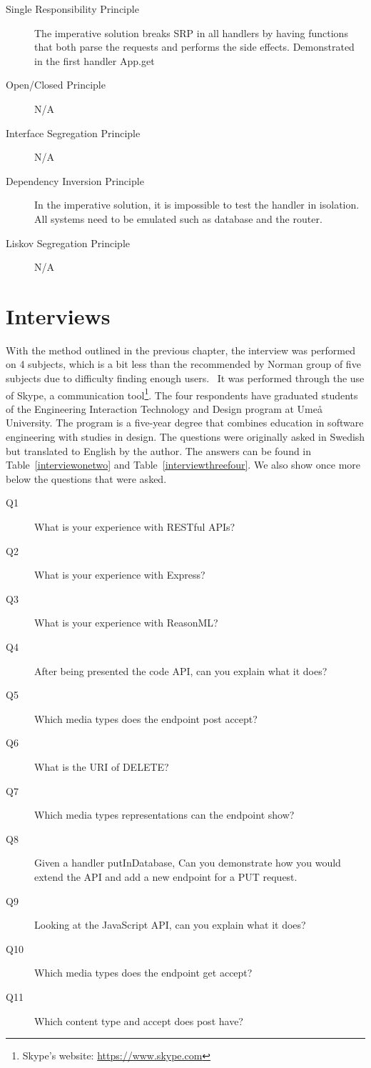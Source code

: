 \begin{description}
	\item[Single Responsibility Principle] The imperative solution breaks SRP
in all handlers by having functions that both parse the requests and performs
the side effects. Demonstrated in the first handler App.get
	\item[Open/Closed Principle] N/A
	\item[Interface Segregation Principle] N/A
	\item[Dependency Inversion Principle] In the imperative solution, it is 
impossible to test the handler in isolation. All systems need to be emulated
such as database and the router.
	\item[Liskov Segregation Principle] N/A
\end{description}

\section{Interviews}\label{interviews}

With the method outlined in the previous chapter, the interview was performed on
4 subjects, which is a bit less than the recommended by Norman group of five
subjects due to difficulty finding enough users.~\cite{jakobnielsen}
It was performed through the use of Skype, a communication tool\footnote{Skype's
website: \url{https://www.skype.com}}. The four respondents have graduated
students of the Engineering Interaction Technology and Design program at Umeå
University. The program is a five-year degree that combines education in
software engineering with studies in design. The questions were originally asked
in Swedish but translated to English by the author. The answers can be found in
Table~\ref{interviewonetwo} and Table~\ref{interviewthreefour}. We also show
once more below the questions that were asked.

\begin{description}
    \item[Q1] What is your experience with RESTful APIs?
    \item[Q2] What is your experience with Express?
    \item[Q3] What is your experience with ReasonML?
    \item[Q4] After being presented the code API, can you explain what it does?
    \item[Q5] Which media types does the endpoint post accept?
    \item[Q6] What is the URI of DELETE?
    \item[Q7] Which media types representations can the endpoint show?
    \item[Q8] Given a handler putInDatabase, Can you demonstrate how you would
        extend the API and add a new endpoint for a PUT request.
    \item[Q9] Looking at the JavaScript API, can you explain what it does?
    \item[Q10] Which media types does the endpoint get accept?
    \item[Q11] Which content type and accept does post have?
\end{description}


